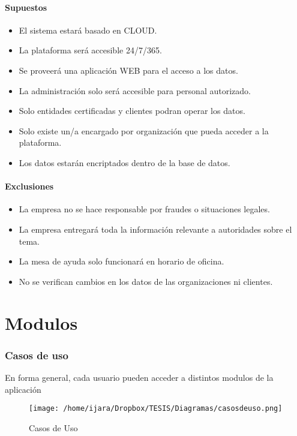\documentclass[letterpaper,openright,10pt,oneside]{report}
\begin{document}
						\subsection{Supuestos}
							\begin{itemize}
								\item El sistema estará basado en CLOUD.
								\item La plataforma será accesible 24/7/365.
								\item Se proveerá una aplicación WEB para el acceso a los datos.
								\item La administración solo será accesible para personal autorizado.
								\item Solo entidades certificadas y clientes podran operar los datos.
								\item Solo existe un/a encargado por organización que pueda acceder a la plataforma.
								\item Los datos estarán encriptados dentro de la base de datos.
							\end{itemize}
						\subsection{Exclusiones}
							\begin{itemize}
								\item La empresa no se hace responsable por fraudes o situaciones legales.
								\item La empresa entregará toda la información relevante a autoridades sobre el tema.
								\item La mesa de ayuda solo funcionará en horario de oficina.
								\item No se verifican cambios en los datos de las organizaciones ni clientes.
							\end{itemize}
\part{Modulos}
\section{Casos de uso}
	En forma general, cada usuario pueden acceder a distintos modulos de la aplicación
	\begin{figure}[htp]
\centering
\texttt{[image: /home/ijara/Dropbox/TESIS/Diagramas/casosdeuso.png]}
\caption{Casos de Uso}

\label{}\end{figure}\newpage
\end{document}
